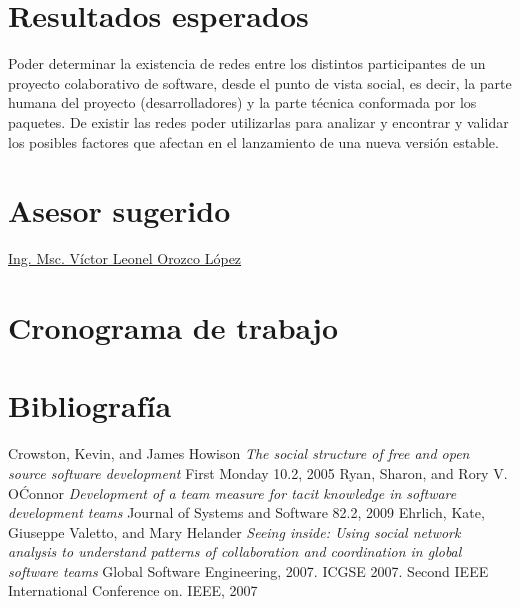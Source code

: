 \documentclass[12pt]{report}
\begin{document}
\chapter*{Resultados esperados}
Poder determinar  la existencia  de redes  entre los
distintos participantes de un proyecto colaborativo de software, desde
el  punto de  vista social,  es decir,  la parte  humana del  proyecto
(desarrolladores) y la  parte técnica conformada por  los paquetes. De
existir  las  redes poder  utilizarlas  para  analizar y  encontrar  y
validar los  posibles factores  que afectan en  el lanzamiento  de una
nueva versión estable.

\chapter*{Asesor sugerido}

\href{http://vorozco.com/cv/index-es.html}{Ing.  Msc.   Víctor  Leonel
Orozco López}


\chapter*{Cronograma de trabajo} %

\chapter*{Bibliografía} 
\begin{thebibliography}{9}
 Crowston,  Kevin, and James  Howison \textit{The
    social  structure of  free and  open source  software development}
First Monday 10.2, 2005
    Ryan,    Sharon,    and   Rory    V.    O\'Connor
  \textit{Development  of  a  team  measure  for  tacit  knowledge  in
    software development teams}
 Journal  of Systems  and Software 82.2, 2009
Ehrlich, Kate, Giuseppe Valetto, and Mary  Helander
\textit{Seeing inside: Using social
  network  analysis  to  understand   patterns  of  collaboration  and
  coordination   in   global   software  teams}
Global   Software Engineering,   2007.   ICGSE   2007.    Second  IEEE   International
  Conference on.   IEEE, 2007
\end{thebibliography}


\end{document}
